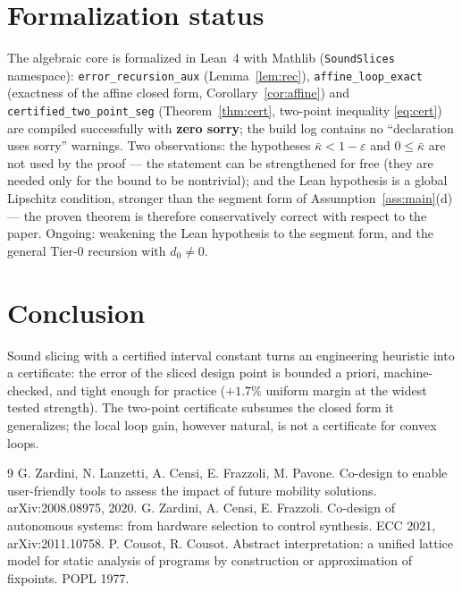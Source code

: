 \documentclass[11pt]{article}
\numberwithin{equation}{section}
\begin{document}
\section{Formalization status}\label{sec:formal}
The algebraic core is formalized in Lean~4 with Mathlib
(\texttt{SoundSlices} namespace):
\texttt{error\_recursion\_\allowbreak aux} (Lemma~\ref{lem:rec}),
\texttt{affine\_loop\_exact} (exactness of the affine closed form,
Corollary~\ref{cor:affine}) and \texttt{certified\_\allowbreak two\_point\_seg}
(Theorem~\ref{thm:cert}, two-point inequality \eqref{eq:cert}) are compiled
successfully with \textbf{zero sorry}; the build log contains no
``declaration uses sorry'' warnings. Two observations: the hypotheses
$\bar\kappa<1-\varepsilon$ and $0\le\bar\kappa$ are not used by the proof ---
the statement can be strengthened for free (they are needed only for the
bound to be nontrivial); and the Lean hypothesis is a global Lipschitz
condition, stronger than the segment form of
Assumption~\ref{ass:main}(d) --- the proven theorem is therefore conservatively
correct with respect to the paper. Ongoing: weakening the Lean hypothesis to
the segment form, and the general Tier-0 recursion with $d_0\ne0$.

\section{Conclusion}
Sound slicing with a certified interval constant turns an engineering
heuristic into a certificate: the error of the sliced design point is bounded
a priori, machine-checked, and tight enough for practice ($+1.7\%$ uniform
margin at the widest tested strength). The two-point certificate subsumes the
closed form it generalizes; the local loop gain, however natural, is not a
certificate for convex loops.

\begin{thebibliography}{9}
 G. Zardini, N. Lanzetti, A. Censi, E. Frazzoli, M. Pavone. Co-design to enable user-friendly tools to assess the impact of future mobility solutions. arXiv:2008.08975, 2020.
 G. Zardini, A. Censi, E. Frazzoli. Co-design of autonomous systems: from hardware selection to control synthesis. ECC 2021, arXiv:2011.10758.
 P. Cousot, R. Cousot. Abstract interpretation: a unified lattice model for static analysis of programs by construction or approximation of fixpoints. POPL 1977.
\end{thebibliography}
\end{document}
